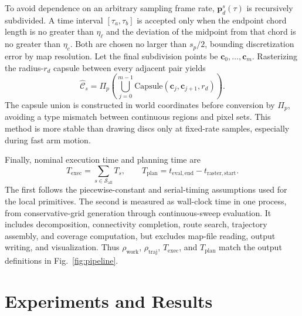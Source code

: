 \documentclass[a4paper,11pt]{article}
\begin{document}
To avoid dependence on an arbitrary sampling frame rate, $\mathbf p_d^s(\tau)$ is recursively subdivided. A time interval $[\tau_a,\tau_b]$ is accepted only when the endpoint chord length is no greater than $\eta_\ell$ and the deviation of the midpoint from that chord is no greater than $\eta_c$. Both are chosen no larger than $s_p/2$, bounding discretization error by map resolution. Let the final subdivision points be $\mathbf c_0,\ldots,\mathbf c_m$. Rasterizing the radius-$r_d$ capsule between every adjacent pair yields
\begin{equation}
\widehat{\mathcal C}_s=\Pi_p\!\left(\bigcup_{j=0}^{m-1}\mathrm{Capsule}(\mathbf c_j,\mathbf c_{j+1},r_d)\right).
\tag{27}
\label{eq:rasterized-sweep}
\end{equation}
The capsule union is constructed in world coordinates before conversion by $\Pi_p$, avoiding a type mismatch between continuous regions and pixel sets. This method is more stable than drawing discs only at fixed-rate samples, especially during fast arm motion.

Finally, nominal execution time and planning time are
\begin{equation}
T_{\mathrm{exec}}=\sum_{s\in\mathcal S_{\mathrm{all}}}T_s,
\qquad
T_{\mathrm{plan}}=t_{\mathrm{eval,end}}-t_{\mathrm{raster,start}}.
\tag{28}
\label{eq:timing-measures}
\end{equation}
The first follows the piecewise-constant and serial-timing assumptions used for the local primitives. The second is measured as wall-clock time in one process, from conservative-grid generation through continuous-sweep evaluation. It includes decomposition, connectivity completion, route search, trajectory assembly, and coverage computation, but excludes map-file reading, output writing, and visualization. Thus $\rho_{\mathrm{work}}$, $\rho_{\mathrm{traj}}$, $T_{\mathrm{exec}}$, and $T_{\mathrm{plan}}$ match the output definitions in Fig.~\ref{fig:pipeline}.

\section{Experiments and Results}
\label{sec:experiments}
\end{document}

